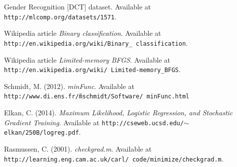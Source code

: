\documentclass{article} %
\begin{document}
\begin{thebibliography}{1}

 Gender Recognition [DCT] dataset. Available at {\tt http://mlcomp.org/datasets/1571}.

 Wikipedia article {\em Binary classification}. Available at {\tt http://en.wikipedia.org/wiki/Binary\_ classification}.

 Wikipedia article {\em Limited-memory BFGS}. Available at {\tt http://en.wikipedia.org/wiki/ Limited-memory\_BFGS}.

 Schmidt, M. (2012). {\em minFunc}. Available at {\tt http://www.di.ens.fr/\~mschmidt/Software/ minFunc.html}

 Elkan, C. (2014). {\em Maximum Likelihood, Logistic Regression, and Stochastic Gradient Training}. Available at {\tt http://cseweb.ucsd.edu/$\sim$elkan/250B/logreg.pdf}.

 Rasmussen, C. (2001). {\em checkgrad.m}. Available at {\tt http://learning.eng.cam.ac.uk/carl/ code/minimize/checkgrad.m}.

\end{thebibliography}
\end{document}
